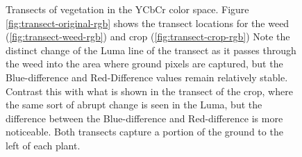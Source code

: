 \documentclass[letterpaper]{report}
\begin{document}
\begin{figure}[h]
	\centering
	\hfill
	\hfill
	\caption[YCbCr Transects]{Transects of vegetation in the YCbCr color space. Figure \ref{fig:transect-original-rgb} shows the transect locations for the weed (\ref{fig:transect-weed-rgb}) and crop (\ref{fig:transect-crop-rgb}) Note the distinct change of the Luma line of the transect as it passes through the weed into the area where ground pixels are captured, but the Blue-difference and Red-Difference values remain relatively stable. Contrast this with what is shown in the transect of the crop, where the same sort of abrupt change is seen in the Luma, but the difference between the Blue-difference and Red-difference is more noticeable. Both transects capture a portion of the ground to the left of each plant.}
	\label{fig:transects-ycbcr}
\end{figure}
\end{document}
